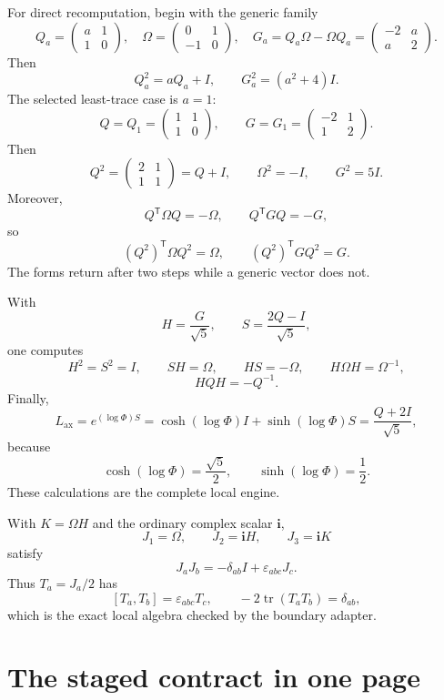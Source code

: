 \documentclass[11pt]{article}
\newcommand{\tr}{\operatorname{tr}}
\begin{document}
For direct recomputation, begin with the generic family
\[
Q_a=\begin{pmatrix}a&1\\1&0\end{pmatrix},
\quad
\Omega=\begin{pmatrix}0&1\\-1&0\end{pmatrix},
\quad
G_a=Q_a\Omega-\Omega Q_a
=\begin{pmatrix}-2&a\\a&2\end{pmatrix}.
\]
Then
\[
Q_a^2=aQ_a+I,
\qquad
G_a^2=(a^2+4)I.
\]
The selected least-trace case is $a=1$:
\[
Q=Q_1=\begin{pmatrix}1&1\\1&0\end{pmatrix},
\qquad
G=G_1=\begin{pmatrix}-2&1\\1&2\end{pmatrix}.
\]
Then
\[
Q^2=\begin{pmatrix}2&1\\1&1\end{pmatrix}=Q+I,
\qquad
\Omega^2=-I,
\qquad
G^2=5I.
\]
Moreover,
\[
Q^{\mathsf T}\Omega Q=-\Omega,
\qquad
Q^{\mathsf T}GQ=-G,
\]
so
\[
(Q^2)^{\mathsf T}\Omega Q^2=\Omega,
\qquad
(Q^2)^{\mathsf T}GQ^2=G.
\]
The forms return after two steps while a generic vector does not.

With
\[
H=\frac{G}{\sqrt5},
\qquad
S=\frac{2Q-I}{\sqrt5},
\]
one computes
\[
H^2=S^2=I,
\qquad
SH=\Omega,
\qquad
HS=-\Omega,
\qquad
H\Omega H=\Omega^{-1},
\]
\[
HQH=-Q^{-1}.
\]
Finally,
\[
L_{\mathrm{ax}}
=e^{(\log\Phi)S}
=\cosh(\log\Phi)I+\sinh(\log\Phi)S
=\frac{Q+2I}{\sqrt5},
\]
because
\[
\cosh(\log\Phi)=\frac{\sqrt5}{2},
\qquad
\sinh(\log\Phi)=\frac12.
\]
These calculations are the complete local engine.


With $K=\Omega H$ and the ordinary complex scalar $\mathbf i$,
\[
J_1=\Omega,
\qquad
J_2=\mathbf iH,
\qquad
J_3=\mathbf iK
\]
satisfy
\[
J_aJ_b=-\delta_{ab}I+\varepsilon_{abc}J_c.
\]
Thus $T_a=J_a/2$ has
\[
[T_a,T_b]=\varepsilon_{abc}T_c,
\qquad
-2\tr(T_aT_b)=\delta_{ab},
\]
which is the exact local algebra checked by the boundary adapter.

\section{The staged contract in one page}
\end{document}
